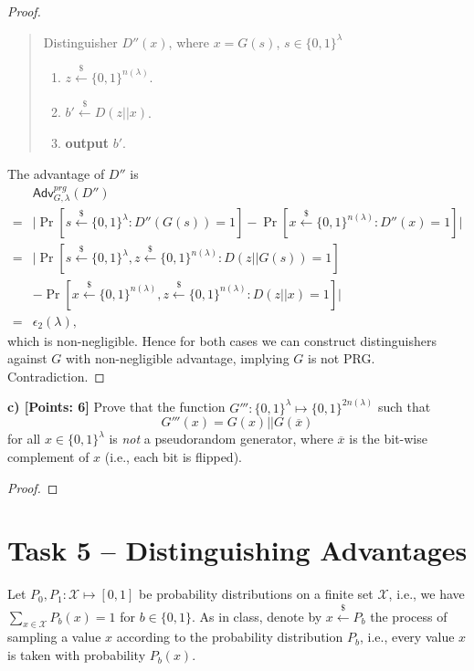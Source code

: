 \documentclass[12pt]{article}
\newcommand{\bits}{\{0,1\}}
\newcommand{\getsr}{\stackrel{\$}{\gets}}
\newcommand{\Adv}{\textsf{Adv}}
\theoremstyle{definition}
\begin{document}
\begin{proof}
\begin{quote}
Distinguisher $D'' (x)$, where $x=G(s)$, $s\in\bits^\lambda$
\begin{enumerate}
\item $z\getsr\bits^{n(\lambda)}$.
\item $b' \getsr D(z||x)$.
\item {\bf output} $b'$.
\end{enumerate}
\end{quote}
The advantage of $D''$ is
$$
\begin{aligned}
& \Adv_{G,\lambda}^{prg}(D'') \\
=& \bigg| \Pr[s\getsr\bits^\lambda : D''(G(s))=1] - \Pr[x\getsr\bits^{n(\lambda)}: D''(x)=1] \bigg| \\
=& \bigg| \Pr[s\getsr\bits^\lambda, z\getsr\bits^{n(\lambda)} : D(z||G(s))=1]\\
& - \Pr[x\getsr\bits^{n(\lambda)}, z\getsr\bits^{n(\lambda)}: D(z||x)=1] \bigg| \\
=& \epsilon_2(\lambda),
\end{aligned}
$$
which is non-negligible.
Hence for both cases we can construct distinguishers against $G$ with non-negligible advantage, implying $G$ is not PRG. Contradiction.
\end{proof}

{\bf c) [Points: 6]} Prove that the function $G''' : \bits^{\lambda} \mapsto \bits^{2n(\lambda)}$ such that
$$G'''(x) = G(x)||G(\overline{x})$$
for all $x\in\bits^\lambda$ is \emph{not} a pseudorandom generator, where $\overline{x}$ is the bit-wise complement of $x$ (i.e., each bit is flipped).
\begin{proof}

\end{proof}


\section{Task 5 – Distinguishing Advantages}
Let $P_0, P_1 : \mathcal{X} \mapsto [0,1]$ be probability distributions on a finite set $\mathcal{X}$, i.e., we have $\sum_{x\in\mathcal{X}}P_b(x) = 1$ for $b\in\bits$. As in class, denote by $x\getsr P_b$ the process of sampling a value $x$ according to the probability distribution $P_b$, i.e., every value $x$ is taken with probability $P_b(x)$.
\end{document}
